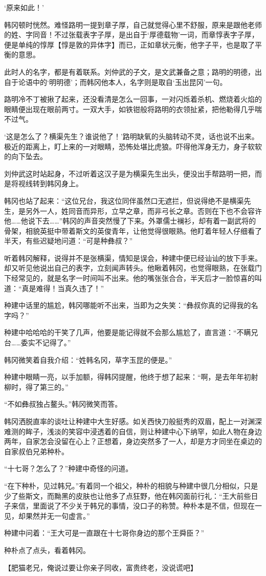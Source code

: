 ‘原来如此！’

韩冈顿时恍然。难怪路明一提到章子厚，自己就觉得心里不舒服，原来是跟他老师的姓、字同音！不过张载表字子厚，是出自于‘厚德载物’一词，而章惇表字子厚，便是单纯的惇厚【惇是敦的异体字】而已，正如章状元衡，他字子平，也是取了平衡的意思。

此时人的名字，都是有着联系。刘仲武的子文，是文武兼备之意；路明的明德，出自于论语中的‘明明德’；而韩冈他本人，名字则是取自‘玉出昆冈’一句。

路明冷不丁被揪了起来，还没看清是怎么一回事，一对闪烁着杀机、燃烧着火焰的眼睛便出现在眼前两寸。一双大手，如铁钳般将路明的衣领扯紧，把他勒得几乎喘不过气。

‘这是怎么了？横渠先生？谁说他了！’路明缺氧的头脑转动不灵，话也说不出来。极近的距离上，盯上来的一对眼睛，恐怖处堪比虎狼。吓得他浑身无力，身子软软的向下坠去。

刘仲武这时站起身，不过听着这汉子是为横渠先生出头，便没出手帮路明一把，而是将视线转到韩冈身上。

韩冈也站了起来：“这位兄台，我这位同伴虽然口无遮拦，但说得绝不是横渠先生，是另外一人，姓同音而异形，立早之章，而非弓长之章。否则在下也不会容许他……他说下去……”韩冈的声音突然慢了下来。外罩儒士襕衫，却有着一副武将的骨架，相貌英挺中带着斯文的英俊青年，让他觉得很眼熟。他盯着年轻人仔细看了半天，有些迟疑地问道：“可是种彝叔？”

听着韩冈解释，说得并不是张横渠，情知是误会，种建中便已经讪讪的放下手来。却又听见他说出自己的表字，立刻闻声转头。他瞅着韩冈，也觉得眼熟，在张载门下经常见的，就是名字一时间叫不出来。他的嘴张张合合，半天后才一脸惊喜的叫道：“真是难得！当真久违了！”

种建中话里的尴尬，韩冈哪能听不出来，当即为之失笑：“彝叔你真的记得我的名字吗？”

种建中哈哈哈的干笑了几声，他要是能记得就不会那么尴尬了，直言道：“不瞒兄台……委实不记得了。”

韩冈微笑着自我介绍：“姓韩名冈，草字玉昆的便是。”

种建中眼睛一亮，以手加额，得韩冈提醒，他终于想了起来：“啊，是去年年初射柳时，得了第三的。”

“不如彝叔独占鳌头。”韩冈微笑而答。

韩冈洒脱直率的谈吐让种建中大生好感。如关西快刀般挺秀的双眉，配上一对渊深难测的眸子，浅淡的笑容中浸透着的自信，则让种建中心下纳罕，如此人物在身边两年，自家怎会没留在心上？正想着，身边突然多了一人，却是方才同坐在桌边的自家叔伯兄弟种朴。

“十七哥？怎么了？”种建中奇怪的问道。

“在下种朴，见过韩兄。”有着同一个祖父，种朴的相貌与种建中很几分相似，只是少了些斯文，而黝黑的皮肤也让他多了点狂野，他在韩冈面前行礼：“王大前些日子来信，里面说了不少关于韩兄的事情，没口子的称赞。种朴本是不信，但现在一见，却果然并无一句虚言。”

种建中问着：“王大可是一直跟在十七哥你身边的那个王舜臣？”

种朴点了点头，看着韩冈。

【肥猫老兄，俺说过要让你亲子同收，富贵终老，没说谎吧】

